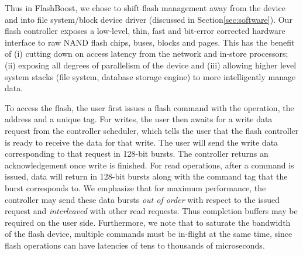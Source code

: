 Thus in FlashBoost, we chose to shift flash management
away from the device and into file system/block device driver (discussed in
Section\ref{sec:software}). Our flash controller exposes a low-level, thin,
fast and bit-error corrected hardware interface to raw NAND flash chips, buses,
blocks and pages. This has the benefit of (i) cutting down on access latency
from the network and in-store processors; (ii) exposing all degrees of
parallelism of the device and (iii) allowing higher level system stacks (file
system, database storage engine) to more intelligently manage data. 

To access the flash, the user first issues a flash command
with the operation, the address and a unique tag.
For writes, the user then awaits for a write data request from
the controller scheduler, which tells the user that the flash controller is
ready to receive the data for that write. The user will send the write data
corresponding to that request in 128-bit bursts. The controller returns an
acknowledgement once write is finished. 
For read operations, after a command is issued,
data will return in 128-bit bursts along with the command tag that the
burst corresponds to. We emphasize that for maximum performance, the
controller may send these data bursts \emph{out of order} with respect to
the issued request and \emph{interleaved} with other read requests.
Thus completion buffers may be required on the user side. Furthermore,
we note that to saturate the bandwidth of the flash device, multiple
commands must be in-flight at the same time, since flash operations
can have latencies of tens to thousands of microseconds. 


